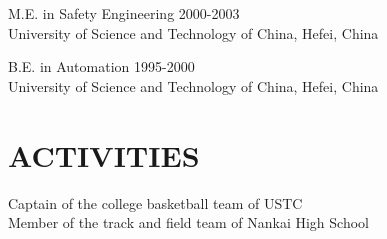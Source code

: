 \documentclass[line,margin]{res}
\begin{document}
\begin{resume}
                M.E. in Safety Engineering \hfill 2000-2003\\
                University of Science and Technology of China, Hefei, China

                B.E. in Automation \hfill 1995-2000\\
                University of Science and Technology of China, Hefei, China
 
\section{ACTIVITIES}             
                Captain of the college basketball team of USTC\\
                Member of the track and field team of Nankai High School

\end{resume}
\end{document}
